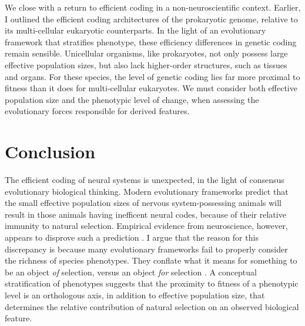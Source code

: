 \documentclass{article}
\begin{document}
We close with a return to efficient coding in a non-neuroscientific context. Earlier, I outlined the efficient coding architectures of the prokaryotic genome, relative to its multi-cellular eukaryotic counterparts. In the light of an evolutionary framework that stratifies phenotype, these efficiency differences in genetic coding remain sensible. Unicellular organisms, like prokaryotes, not only possess large effective population sizes, but also lack higher-order structures, such as tissues and organs. For these species, the level of genetic coding lies far more proximal to fitness than it does for multi-cellular eukaryotes. We must consider both effective population size and the phenotypic level of change, when assessing the evolutionary forces responsible for derived features. 


\section{Conclusion}
The efficient coding of neural systems is unexpected, in the light of consensus evolutionary biological thinking. Modern evolutionary frameworks predict that the small effective population sizes of nervous system-possessing animals will result in those animals having inefficent neural codes, because of their relative immunity to natural selection. Empirical evidence from neuroscience, however, appears to disprove such a prediction \cite{smith_lewicki_2006, olshausen_field_1996, Machens_Gollisch_Kolesnikova_Herz_2005, Pitkow_Meister_2012, barlow_1952, fairhall_deRuyterVan_2001}. I argue that the reason for this discrepancy is because many evolutionary frameworks fail to properly consider the richness of species phenotypes. They conflate what it means for something to be an object \textit{of} selection, versus an object \textit{for} selection \cite{sober1993nature, mayr_1997}. A conceptual stratification of phenotypes suggests that the proximity to fitness of a phenotypic level is an orthologous axis, in addition to effective population size, that determines the relative contribution of natural selection on an observed biological feature. 
\end{document}
